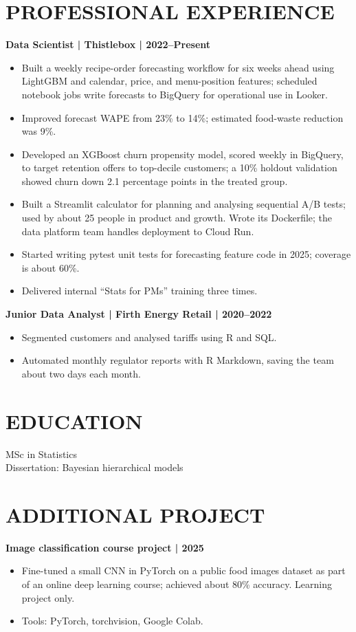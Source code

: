 \documentclass[11pt,a4paper]{article}
\begin{document}
\section*{PROFESSIONAL EXPERIENCE}
\textbf{Data Scientist | Thistlebox | 2022–Present}
\begin{itemize}
\item Built a weekly recipe-order forecasting workflow for six weeks ahead using LightGBM and calendar, price, and menu-position features; scheduled notebook jobs write forecasts to BigQuery for operational use in Looker.
\item Improved forecast WAPE from 23\% to 14\%; estimated food-waste reduction was 9\%.
\item Developed an XGBoost churn propensity model, scored weekly in BigQuery, to target retention offers to top-decile customers; a 10\% holdout validation showed churn down 2.1 percentage points in the treated group.
\item Built a Streamlit calculator for planning and analysing sequential A/B tests; used by about 25 people in product and growth. Wrote its Dockerfile; the data platform team handles deployment to Cloud Run.
\item Started writing pytest unit tests for forecasting feature code in 2025; coverage is about 60\%.
\item Delivered internal “Stats for PMs” training three times.
\end{itemize}
\textbf{Junior Data Analyst | Firth Energy Retail | 2020–2022}
\begin{itemize}
\item Segmented customers and analysed tariffs using R and SQL.
\item Automated monthly regulator reports with R Markdown, saving the team about two days each month.
\end{itemize}
\section*{EDUCATION}
MSc in Statistics\\
Dissertation: Bayesian hierarchical models
\section*{ADDITIONAL PROJECT}
\textbf{Image classification course project | 2025}
\begin{itemize}
\item Fine-tuned a small CNN in PyTorch on a public food images dataset as part of an online deep learning course; achieved about 80\% accuracy. Learning project only.
\item Tools: PyTorch, torchvision, Google Colab.
\end{itemize}
\end{document}
